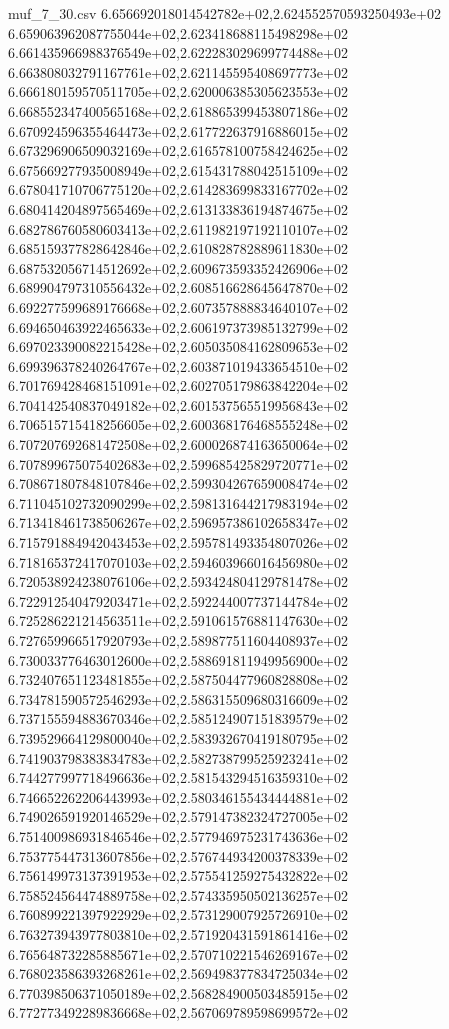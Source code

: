\begin{filecontents*}{muf_7_30.csv}
6.656692018014542782e+02,2.624552570593250493e+02
6.659063962087755044e+02,2.623418688115498298e+02
6.661435966988376549e+02,2.622283029699774488e+02
6.663808032791167761e+02,2.621145595408697773e+02
6.666180159570511705e+02,2.620006385305623553e+02
6.668552347400565168e+02,2.618865399453807186e+02
6.670924596355464473e+02,2.617722637916886015e+02
6.673296906509032169e+02,2.616578100758424625e+02
6.675669277935008949e+02,2.615431788042515109e+02
6.678041710706775120e+02,2.614283699833167702e+02
6.680414204897565469e+02,2.613133836194874675e+02
6.682786760580603413e+02,2.611982197192110107e+02
6.685159377828642846e+02,2.610828782889611830e+02
6.687532056714512692e+02,2.609673593352426906e+02
6.689904797310556432e+02,2.608516628645647870e+02
6.692277599689176668e+02,2.607357888834640107e+02
6.694650463922465633e+02,2.606197373985132799e+02
6.697023390082215428e+02,2.605035084162809653e+02
6.699396378240264767e+02,2.603871019433654510e+02
6.701769428468151091e+02,2.602705179863842204e+02
6.704142540837049182e+02,2.601537565519956843e+02
6.706515715418256605e+02,2.600368176468555248e+02
6.707207692681472508e+02,2.600026874163650064e+02
6.707899675075402683e+02,2.599685425829720771e+02
6.708671807848107846e+02,2.599304267659008474e+02
6.711045102732090299e+02,2.598131644217983194e+02
6.713418461738506267e+02,2.596957386102658347e+02
6.715791884942043453e+02,2.595781493354807026e+02
6.718165372417070103e+02,2.594603966016456980e+02
6.720538924238076106e+02,2.593424804129781478e+02
6.722912540479203471e+02,2.592244007737144784e+02
6.725286221214563511e+02,2.591061576881147630e+02
6.727659966517920793e+02,2.589877511604408937e+02
6.730033776463012600e+02,2.588691811949956900e+02
6.732407651123481855e+02,2.587504477960828808e+02
6.734781590572546293e+02,2.586315509680316609e+02
6.737155594883670346e+02,2.585124907151839579e+02
6.739529664129800040e+02,2.583932670419180795e+02
6.741903798383834783e+02,2.582738799525923241e+02
6.744277997718496636e+02,2.581543294516359310e+02
6.746652262206443993e+02,2.580346155434444881e+02
6.749026591920146529e+02,2.579147382324727005e+02
6.751400986931846546e+02,2.577946975231743636e+02
6.753775447313607856e+02,2.576744934200378339e+02
6.756149973137391953e+02,2.575541259275432822e+02
6.758524564474889758e+02,2.574335950502136257e+02
6.760899221397922929e+02,2.573129007925726910e+02
6.763273943977803810e+02,2.571920431591861416e+02
6.765648732285885671e+02,2.570710221546269167e+02
6.768023586393268261e+02,2.569498377834725034e+02
6.770398506371050189e+02,2.568284900503485915e+02
6.772773492289836668e+02,2.567069789598699572e+02

\end{filecontents*}

